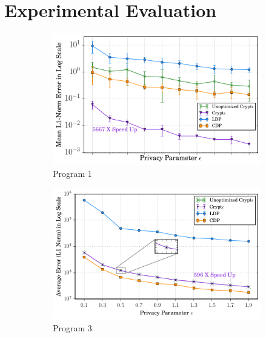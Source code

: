 \section{Experimental Evaluation}
\begin{figure}[ht]

    \begin{subfigure}[b]{0.25\linewidth}
        \centering
         \includegraphics[width=1\linewidth]{t8_final.pdf}
        \caption{ Program 1}
        \label{fig:P1}
    \end{subfigure}%
    \begin{subfigure}[b]{0.25\linewidth}
    \centering \includegraphics[width=1\linewidth]{t3_finals.pdf}
        \caption{Program 3}
        \label{fig:P3}\end{subfigure}%
    \begin{subfigure}[b]{0.25\linewidth}

\end{subfigure}
\end{figure}
